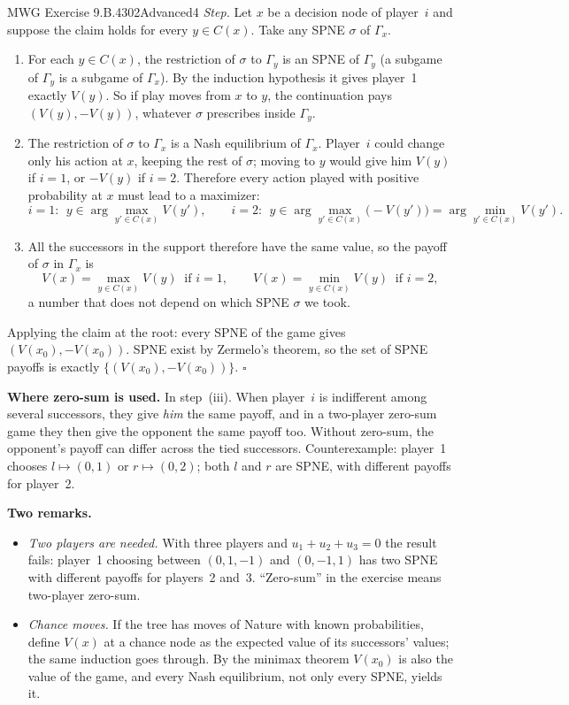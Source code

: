 \begin{exsol}{MWG Exercise 9.B.4}{302}{Advanced}{4}
\emph{Step.} Let $x$ be a decision node of player~$i$ and suppose the claim holds for every
$y \in C(x)$. Take any SPNE $\sigma$ of $\Gamma_x$.
\begin{enumerate}[label=(\roman*)]
  \item For each $y \in C(x)$, the restriction of $\sigma$ to $\Gamma_y$ is an SPNE of $\Gamma_y$ (a
  subgame of $\Gamma_y$ is a subgame of $\Gamma_x$). By the induction hypothesis it gives player~1
  exactly $V(y)$. So if play moves from $x$ to $y$, the continuation pays $(V(y), -V(y))$, whatever
  $\sigma$ prescribes inside $\Gamma_y$.
  \item The restriction of $\sigma$ to $\Gamma_x$ is a Nash equilibrium of $\Gamma_x$. Player~$i$ could
  change only his action at $x$, keeping the rest of $\sigma$; moving to $y$ would give him
  $V(y)$ if $i = 1$, or $-V(y)$ if $i = 2$. Therefore every action played with positive probability at
  $x$ must lead to a maximizer:
  \[
    i = 1:\ \ y \in \arg\max_{y' \in C(x)} V(y'), \qquad
    i = 2:\ \ y \in \arg\max_{y' \in C(x)} \bigl(-V(y')\bigr) = \arg\min_{y' \in C(x)} V(y').
  \]
  \item All the successors in the support therefore have the same value, so the payoff of $\sigma$ in
  $\Gamma_x$ is
  \[
    V(x) = \max_{y \in C(x)} V(y) \ \text{ if } i = 1, \qquad V(x) = \min_{y \in C(x)} V(y) \ \text{ if } i = 2,
  \]
  a number that does not depend on which SPNE $\sigma$ we took.
\end{enumerate}
Applying the claim at the root: every SPNE of the game gives $(V(x_0), -V(x_0))$. SPNE exist by
Zermelo's theorem, so the set of SPNE payoffs is exactly $\{(V(x_0), -V(x_0))\}$. $\square$

\textbf{Where zero-sum is used.} In step~(iii). When player~$i$ is indifferent among several
successors, they give \emph{him} the same payoff, and in a two-player zero-sum game they then give
the opponent the same payoff too. Without zero-sum, the opponent's payoff can differ across the
tied successors. Counterexample: player~1 chooses $l \mapsto (0,1)$ or $r \mapsto (0,2)$; both
$l$ and $r$ are SPNE, with different payoffs for player~2.

\textbf{Two remarks.}
\begin{itemize}
  \item \emph{Two players are needed.} With three players and $u_1 + u_2 + u_3 = 0$ the result fails:
  player~1 choosing between $(0, 1, -1)$ and $(0, -1, 1)$ has two SPNE with different payoffs for
  players~2 and~3. ``Zero-sum'' in the exercise means two-player zero-sum.
  \item \emph{Chance moves.} If the tree has moves of Nature with known probabilities, define $V(x)$ at
  a chance node as the expected value of its successors' values; the same induction goes through.
  By the minimax theorem $V(x_0)$ is also the value of the game, and every Nash equilibrium, not
  only every SPNE, yields it.
\end{itemize}


\end{exsol}
